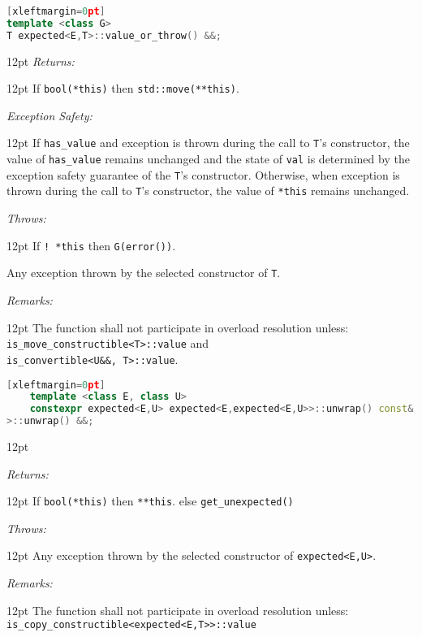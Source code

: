 \documentclass[a4paper,10pt]{article}
\newcommand{\cpp}[1]{\lstinline{#1}}
\newcommand{\wordingItem}[1]{\noindent\textit{#1:}}
\newenvironment{wordingTextItem}[1]{\wordingItem{#1}\vspace{2pt}\noindent\begin{adjustwidth}{12pt}{}}{\vspace{2pt}\end{adjustwidth}}
\newenvironment{wordingPara}{\begin{adjustwidth}{12pt}{}}{\end{adjustwidth}}
\begin{document}
\begin{lstlisting}[language=C++][xleftmargin=0pt]
template <class G>
T expected<E,T>::value_or_throw() &&; 
\end{lstlisting}
\begin{wordingPara}
\begin{wordingTextItem}{Returns}
If \cpp{bool(*this)} then \cpp{std::move(**this)}.
\end{wordingTextItem}
\begin{wordingTextItem}{Exception Safety}
If \cpp{has_value} and exception is thrown during the call to \cpp{T}'s constructor, the value of \cpp{has_value} remains unchanged and the state of \cpp{val} is determined by the exception safety guarantee of the \cpp{T}'s constructor. Otherwise, when exception is thrown during the call to \cpp{T}'s constructor, the value of \cpp{*this} remains unchanged.
\end{wordingTextItem}
\begin{wordingTextItem}{Throws}
If \cpp{! *this} then \cpp{G(error())}.

\noindent
Any exception thrown by the selected constructor of \cpp{T}.
\end{wordingTextItem}
\begin{wordingTextItem}{Remarks}
The function shall not participate in overload resolution unless: \\
\cpp{is_move_constructible<T>::value} and \\
\cpp{is_convertible<U&&, T>::value}.
\end{wordingTextItem}
\end{wordingPara}

\begin{lstlisting}[language=C++][xleftmargin=0pt]
    template <class E, class U>
    constexpr expected<E,U> expected<E,expected<E,U>>::unwrap() const&;
>::unwrap() &&;
\end{lstlisting}

\begin{wordingPara}

\begin{wordingTextItem}{Returns}
If \cpp{bool(*this)} then \cpp{**this}.
else \cpp{get_unexpected()}
\end{wordingTextItem}

\begin{wordingTextItem}{Throws}
Any exception thrown by the selected constructor of \cpp{expected<E,U>}.
\end{wordingTextItem}

\begin{wordingTextItem}{Remarks}
The function shall not participate in overload resolution unless: \\
\cpp{is_copy_constructible<expected<E,T>>::value} \\
\end{wordingTextItem}

\end{wordingPara}
\end{document}
